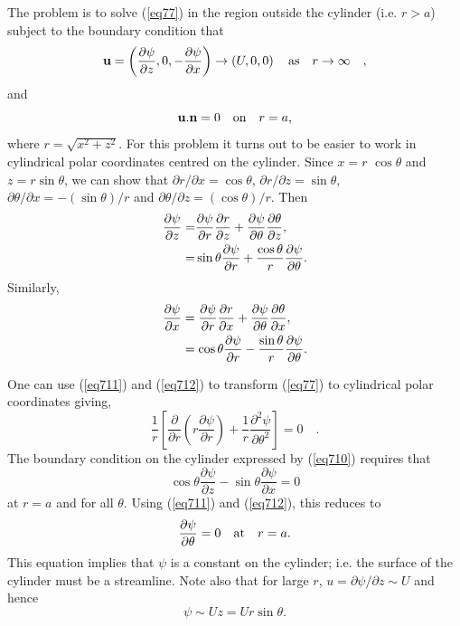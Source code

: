 \documentclass[10pt]{report}
\begin{document}
The problem is to solve (\ref{eq77}) in the region outside the cylinder (i.e. $ r
> a$) subject to the boundary condition that
\begin{equation}
\label{eq78}
{{\bf u}}=\left( {\frac{\partial \psi }{\partial z},0,-\frac{\partial
\psi }{\partial x}} \right)\to \left( {U,0,0} \right)\quad\hbox{as}\quad r\to \infty
\quad ,
\end{equation}
and
\begin{equation} {{\bf u}}. {{\bf n}}=0\quad \hbox{on}\quad r=a, \label{eq710} \end{equation}
where $r=\sqrt {x^2+z^2} $. For this problem it turns out to be easier to
work in cylindrical polar coordinates centred on the cylinder. Since $x = r$
$\cos \theta $ and $z = r \sin \theta $, we can show that $\partial
r/\partial x = \cos\theta $, $\partial r/\partial z = \sin\theta $,
$\partial \theta /\partial x = -(\sin \theta )/r$ and $\partial
\theta /\partial z = (\cos \theta )/r$.
Then
\begin{align} \frac{\partial \psi }{\partial z}= & \frac{\partial \psi }{\partial
r}\frac{\partial r}{\partial z}+\frac{\partial \psi }{\partial \theta
}\frac{\partial \theta }{\partial z}, \notag \\
= & \sin \theta \frac{\partial \psi
}{\partial r}+\frac{\cos \theta }{r}\frac{\partial \psi }{\partial \theta }. \label{eq711} \end{align}
Similarly,
\begin{align} \frac{\partial \psi }{\partial x} & =\frac{\partial \psi }{\partial
r}\frac{\partial r}{\partial x}+\frac{\partial \psi }{\partial \theta
}\frac{\partial \theta }{\partial x}, \notag \\
& =\cos \theta
\frac{\partial \psi }{\partial r}-\frac{\sin \theta }{r}\frac{\partial \psi
}{\partial \theta }. \label{eq712} \end{align}

One can use (\ref{eq711}) and (\ref{eq712}) to transform (\ref{eq77}) to cylindrical polar
coordinates giving,
\begin{equation}
\label{eq79}
\frac{1}{r}\left[ {\frac{\partial }{\partial r}\left( {r\frac{\partial
\psi }{\partial r}} \right)+\frac{1}{r}\frac{\partial ^2\psi
}{\partial \theta ^2}} \right]=0\quad .
\end{equation}
The boundary condition on the cylinder expressed by (\ref{eq710}) requires that
\[
\cos \theta \frac{\partial \psi }{\partial z}-\sin \theta \frac{\partial
\psi }{\partial x}=0
\]
at $r = a$ and for all $\theta $. Using (\ref{eq711}) and (\ref{eq712}), this reduces to
\[ \frac{\partial \psi }{\partial \theta }=0 \quad \hbox{at}\quad  r = a. \label{eq714} \]
This equation implies that $\psi $ is a constant on the cylinder; i.e. the
surface of the cylinder must be a streamline. Note also that for large $r$,
$u = \partial \psi /\partial z \sim  U$ and hence
\begin{equation}
\psi  \sim Uz =
Ur \sin \theta . \label{eq715} \end{equation}
\end{document}
